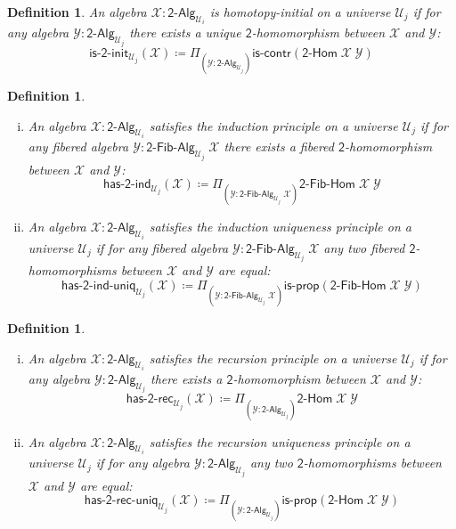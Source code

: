 \documentclass[reqno,10pt,a4paper,oneside]{amsart}
\newcommand{\X}{\mathcal{X}}
\newcommand{\Y}{\mathcal{Y}}
\newcommand{\prd}[1]{\Pi_{#1}}
\newcommand{\defeq}{\coloneqq}
\newcommand{\Bool}{\mathsf{2}}
\newcommand{\UU}{\mathcal{U}}
\newcommand{\BoolAlg}{\mathsf{2}\text{-}\mathsf{Alg}}
\newcommand{\BoolHom}{\mathsf{2}\text{-}\mathsf{Hom}}
\newcommand{\HasBoolRec}{\mathsf{has}\text{-}\mathsf{2}\text{-}\mathsf{rec}}
\newcommand{\HasBoolInd}{\mathsf{has}\text{-}\mathsf{2}\text{-}\mathsf{ind}}
\newcommand{\HasBoolRecUniq}{\mathsf{has}\text{-}\mathsf{2}\text{-}\mathsf{rec}\text{-}\mathsf{uniq}}
\newcommand{\HasBoolIndUniq}{\mathsf{has}\text{-}\mathsf{2}\text{-}\mathsf{ind}\text{-}\mathsf{uniq}}
\newcommand{\BoolFibAlg}{\mathsf{2}\text{-}\mathsf{Fib}\text{-}\mathsf{Alg}}
\newcommand{\BoolFibHom}{\mathsf{2}\text{-}\mathsf{Fib}\text{-}\mathsf{Hom}}
\newcommand{\IsBoolInit}{\mathsf{is}\text{-}\mathsf{2}\text{-}\mathsf{init}}
\newcommand{\iscontr}{\mathsf{is}\text{-}\mathsf{contr}}
\newcommand{\isprop}{\mathsf{is}\text{-}\mathsf{prop}}
\numberwithin{equation}{section}
\theoremstyle{mythm}
\theoremstyle{mydef}
\newtheorem{definition}[theorem]{Definition}
\theoremstyle{myrmk}
\begin{document}
\begin{definition}\label{def:BoolInit}
An algebra $\X : \BoolAlg_{\UU_i}$ is \emph{homotopy-initial} on a universe $\UU_j$ if for any algebra $\Y : \BoolAlg_{\UU_j}$ there exists a unique $\Bool$-homomorphism between $\X$ and $\Y$:
\[ \IsBoolInit_{\UU_j}(\X) \defeq \prd{(\Y:\BoolAlg_{\UU_j})} \iscontr(\BoolHom \; \X \; \Y) \]  
\end{definition}



\begin{definition}\label{def:BoolInd} \label{def:BoolIndUniq} \hfill
\begin{enumerate}[(i)] 
\item An algebra $\mathcal{X} : \BoolAlg_{\UU_i}$ \emph{satisfies the induction principle} on a universe $\UU_j$ if for any 
fibered algebra $\Y : \BoolFibAlg_{\UU_j} \; \X$ there exists a fibered $\Bool$-homomorphism between $\X$ and $\Y$:
\[
\HasBoolInd_{\UU_j}(\X) 
\defeq 
\prd{(\Y:\BoolFibAlg_{\UU_j} \; \X)} \BoolFibHom \; \X \; \Y
\] 
\item An algebra $\X : \BoolAlg_{\UU_i}$ satisfies the \emph{induction uniqueness principle} on a universe $\UU_j$ if for any fibered algebra $\Y : \BoolFibAlg_{\UU_j}\;\X$ any two fibered $\Bool$-homomorphisms between $\X$ and $\Y$ are equal:
\[ 
\HasBoolIndUniq_{\UU_j}(\X) 
\defeq 
\prd{(\Y:\BoolFibAlg_{\UU_j} \; \X)}
 \isprop(\BoolFibHom \; \X \; \Y)
 \]
\end{enumerate}
\end{definition}







\begin{definition}\label{def:BoolRec} \label{def:BoolRecUniq} \hfill
\begin{enumerate}[(i)]
\item 
An algebra $\X : \BoolAlg_{\UU_i}$ \emph{satisfies the recursion principle} on a universe $\UU_j$ if for any 
algebra $\Y : \BoolAlg_{\UU_j}$ there exists a $\Bool$-homomorphism between $\X$ and $\Y$:
\[\HasBoolRec_{\UU_j}(\X) \defeq \prd{(\Y:\BoolAlg_{\UU_j})} \BoolHom \; \X \; \Y\] 
\item 
An algebra $\X : \BoolAlg_{\UU_i}$ satisfies the \emph{recursion uniqueness principle} on a universe $\UU_j$ if for any algebra $\Y : \BoolAlg_{\UU_j}$ any two $\Bool$-homomorphisms between $\X$ and $\Y$ are equal:
\[ \HasBoolRecUniq_{\UU_j}(\X) \defeq \prd{(\Y:\BoolAlg_{\UU_j})} \isprop(\BoolHom \; \X \; \Y)\]
\end{enumerate}
\end{definition}
\end{document}
